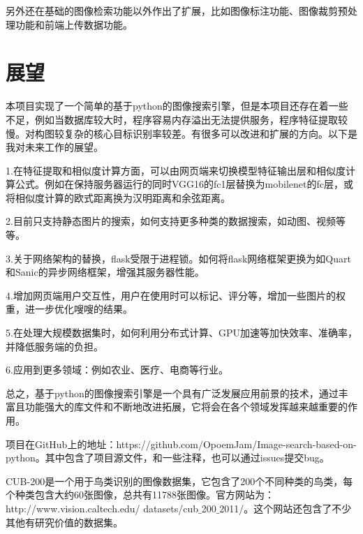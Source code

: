 \documentclass[bachelor_p]{hdu-thesis}
\begin{document}
另外还在基础的图像检索功能以外作出了扩展，比如图像标注功能、图像裁剪预处理功能和前端上传数据功能。

\section{展望}

本项目实现了一个简单的基于python的图像搜索引擎，但是本项目还存在着一些不足，例如当数据库较大时，程序容易内存溢出无法提供服务，程序特征提取较慢。对构图较复杂的核心目标识别率较差。有很多可以改进和扩展的方向。以下是我对未来工作的展望。

1.在特征提取和相似度计算方面，可以由网页端来切换模型特征输出层和相似度计算公式。例如在保持服务器运行的同时VGG16的fc1层替换为mobilenet的fc层，或将相似度计算的欧式距离换为汉明距离和余弦距离。

2.目前只支持静态图片的搜索，如何支持更多种类的数据搜索，如动图、视频等等。

3.关于网络架构的替换，flask受限于进程锁。如何将flask网络框架更换为如Quart和Sanic的异步网络框架，增强其服务器性能。

4.增加网页端用户交互性，用户在使用时可以标记、评分等，增加一些图片的权重，进一步优化嗖嗖的结果。

5.在处理大规模数据集时，如何利用分布式计算、GPU加速等加快效率、准确率，并降低服务端的负担。

6.应用到更多领域：例如农业、医疗、电商等行业。

总之，基于python的图像搜索引擎是一个具有广泛发展应用前景的技术，通过丰富且功能强大的库文件和不断地改进拓展，它将会在各个领域发挥越来越重要的作用。








 






%
%



\hduappendix
项目在GitHub上的地址：https://github.com/OpoemJam/Image-search-based-on-python。其中包含了项目源文件，和一些注释，也可以通过issues提交bug。

CUB-200是一个用于鸟类识别的图像数据集，它包含了200个不同种类的鸟类，每个种类包含大约60张图像，总共有11788张图像。官方网站为：http://www.vision.caltech.edu/
datasets/cub$\_$200$\_$2011/。这个网站还包含了不少其他有研究价值的数据集。
 

\end{document}
